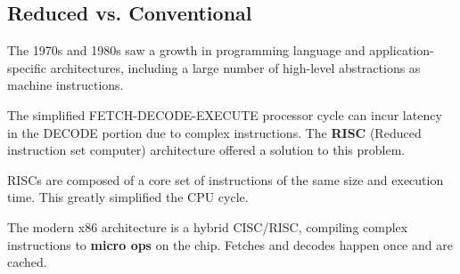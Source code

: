 \documentclass[twoside]{article}
\begin{document}
\subsection{Reduced vs. Conventional}

The 1970s and 1980s saw a growth in programming language and
application-specific architectures, including a large number of high-level
abstractions as machine instructions.

The simplified FETCH-DECODE-EXECUTE processor cycle can incur latency in the
DECODE portion due to complex instructions. The \textbf{RISC} (Reduced instruction
set computer) architecture offered a solution to this problem.

RISCs are composed of a core set of instructions of the same size and execution
time. This greatly simplified the CPU cycle.

The modern x86 architecture is a hybrid CISC/RISC, compiling complex
instructions to \textbf{micro ops} on the chip. Fetches and decodes happen once
and are cached.
\end{document}
